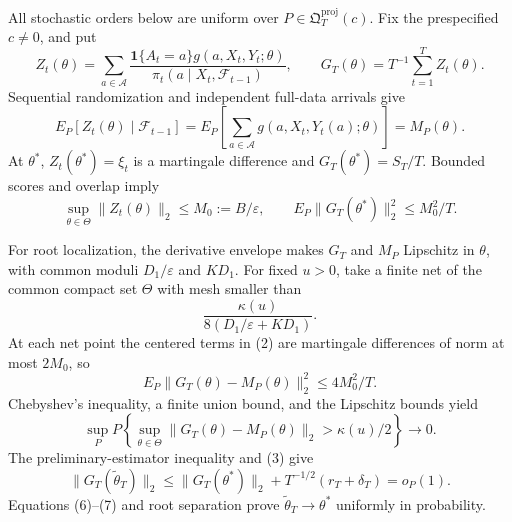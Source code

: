 All stochastic orders below are uniform over \(P\in\mathfrak Q_T^{\mathrm{proj}}(c)\). Fix the prespecified \(c\ne0\), and put
\[
 Z_t(\theta)=\sum_{a\in\mathcal A}
 \frac{\mathbf1\{A_t=a\}g(a,X_t,Y_t;\theta)}
 {\pi_t(a\mid X_t,\mathcal F_{t-1})},
 \qquad G_T(\theta)=T^{-1}\sum_{t=1}^TZ_t(\theta).
\tag{1}
\]
Sequential randomization and independent full-data arrivals give
\[
 E_P[Z_t(\theta)\mid\mathcal F_{t-1}]
 =E_P\!\left[\sum_{a\in\mathcal A}g(a,X_t,Y_t(a);\theta)\right]
 =M_P(\theta).
\tag{2}
\]
At \(\theta^*\), \(Z_t(\theta^*)=\xi_t\) is a martingale difference and \(G_T(\theta^*)=S_T/T\). Bounded scores and overlap imply
\[
 \sup_{\theta\in\Theta}\|Z_t(\theta)\|_2\le M_0:=B/\varepsilon,
 \qquad E_P\|G_T(\theta^*)\|_2^2\le M_0^2/T.
\tag{3}
\]

For root localization, the derivative envelope makes \(G_T\) and \(M_P\) Lipschitz in \(\theta\), with common moduli \(D_1/\varepsilon\) and \(KD_1\). For fixed \(u>0\), take a finite net of the common compact set \(\Theta\) with mesh smaller than
\[
 \frac{\kappa(u)}{8(D_1/\varepsilon+KD_1)}.
\tag{4}
\]
At each net point the centered terms in (2) are martingale differences of norm at most \(2M_0\), so
\[
 E_P\|G_T(\theta)-M_P(\theta)\|_2^2\le4M_0^2/T.
\tag{5}
\]
Chebyshev's inequality, a finite union bound, and the Lipschitz bounds yield
\[
 \sup_P P\!\left\{\sup_{\theta\in\Theta}
 \|G_T(\theta)-M_P(\theta)\|_2>\kappa(u)/2\right\}\longrightarrow0.
\tag{6}
\]
The preliminary-estimator inequality and (3) give
\[
 \|G_T(\widetilde\theta_T)\|_2
 \le\|G_T(\theta^*)\|_2+T^{-1/2}(r_T+\delta_T)=o_P(1).
\tag{7}
\]
Equations (6)--(7) and root separation prove \(\widetilde\theta_T\to\theta^*\) uniformly in probability.

